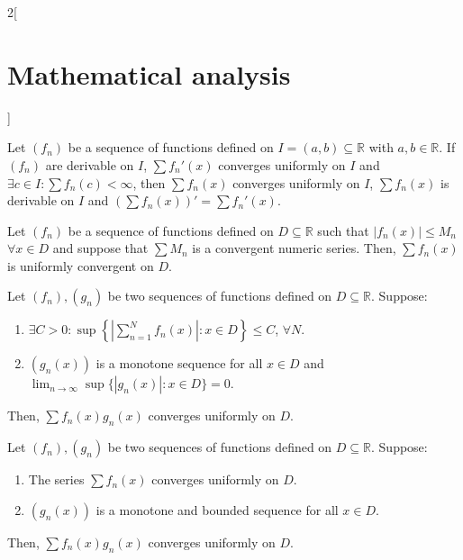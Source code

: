 \documentclass[class=article,crop=false]{standalone}
\begin{document}
\begin{multicols}{2}[\section{Mathematical analysis}]
\begin{theorem}
Let $(f_n)$ be a sequence of functions defined on $I=(a,b)\subseteq\mathbb{R}$ with $a,b\in\mathbb{R}$. If $(f_n)$ are derivable on $I$, $\sum f_n'(x)$ converges uniformly on $I$ and $\displaystyle\exists c\in I: \sum f_n(c)<\infty$, then $\sum f_n(x)$ converges uniformly on $I$, $\sum f_n(x)$ is derivable on $I$ and $\displaystyle\left(\sum f_n(x)\right)'=\sum f_n'(x)$.
\end{theorem}
\begin{theorem}
Let $(f_n)$ be a sequence of functions defined on $D\subseteq\mathbb{R}$ such that $|f_n(x)|\leq M_n$ $\forall x\in D$ and suppose that $\sum M_n$ is a convergent numeric series. Then, $\sum f_n(x)$ is uniformly convergent on $D$.
\end{theorem}
\begin{theorem}
Let $(f_n),(g_n)$ be two sequences of functions defined on $D\subseteq\mathbb{R}$. Suppose:
\begin{enumerate}
    \item $\displaystyle\exists C>0: \sup\left\{\left|\sum_{n=1}^Nf_n(x)\right|:x\in D\right\}\leq C$, $\forall N$.
    \item $(g_n(x))$ is a monotone sequence for all $x\in D$ and $\displaystyle\lim_{n\to\infty}\sup\{|g_n(x)|:x\in D\}=0$.
\end{enumerate}
Then, $\sum f_n(x)g_n(x)$ converges uniformly on $D$.
\end{theorem}
\begin{theorem}
Let $(f_n),(g_n)$ be two sequences of functions defined on $D\subseteq\mathbb{R}$. Suppose:
\begin{enumerate}
    \item The series $\sum f_n(x)$ converges uniformly on $D$.
    \item $(g_n(x))$ is a monotone and bounded sequence for all $x\in D$.
\end{enumerate}
Then, $\sum f_n(x)g_n(x)$ converges uniformly on $D$.
\end{theorem}

\end{multicols}
\end{document}
